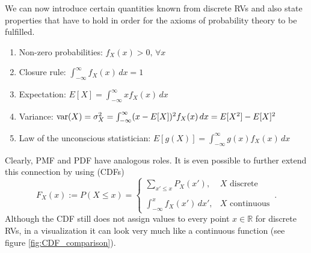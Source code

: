 We can now introduce certain quantities known from discrete RVs and also state properties that have to hold in order for the axioms of probability theory to be fulfilled.
\begin{prop}

\begin{enumerate}
\item Non-zero probabilities: $f_X(x) > 0, \, \forall x$

\item Closure rule: $\int_{- \infty}^\infty f_X(x) \, dx = 1$

\item Expectation: $E[X] = \int_{- \infty}^\infty x f_X(x) \, dx$

\item Variance: $\operatorname{var}(X) = \sigma_X^2 = \int_{- \infty}^\infty (x - E[X])^2 f_X(x) \, dx = E[X^2] - E[X]^2$

\item Law of the unconscious statistician: $E[g(X)] = \int_{-\infty}^\infty g(x) f_X(x) \, dx$
\end{enumerate}
\end{prop}
Clearly, PMF and PDF have analogous roles. It is even possible to further extend this connection by using  (CDFs)
\begin{equation}
F_X(x) := P(X \leq x) = \begin{cases} \displaystyle \sum_{x' \leq x} P_X(x'), & X \text{ discrete} \\\\ \displaystyle \int_{- \infty}^x f_X(x') \, dx', & X \text{ continuous} \end{cases} \, .
\end{equation}
Although the CDF still does not assign values to every point $x \in \mathbb{R}$ for discrete RVs, in a visualization it can look very much like a continuous function (see figure \ref{fig:CDF_comparison}).



